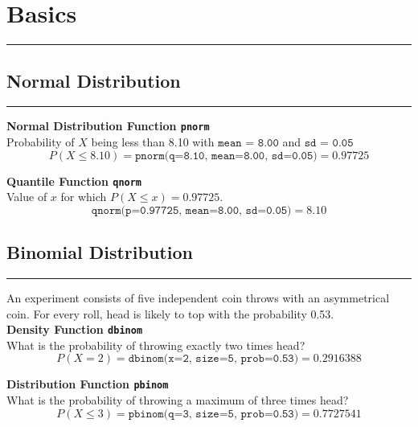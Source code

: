 
\section{Basics}
\noindent\rule[\linienAbstand]{\linewidth}{\linienDickeDick}

\subsection{Normal Distribution}
\noindent\rule[\linienAbstand]{\linewidth}{\linienDicke}
\textbf{Normal Distribution Function \texttt{pnorm}}\\
Probability of $X$ being less than 8.10 with $\texttt{mean = 8.00}$ and $\texttt{sd = 0.05}$
\begin{equation*}
  P(X \leq 8.10) = \texttt{pnorm(q=8.10, mean=8.00, sd=0.05)} = 0.97725
\end{equation*}

\textbf{Quantile Function \texttt{qnorm}}\\
Value of $x$ for which $P(X \leq x) = 0.97725$.
\begin{equation*}
  \texttt{qnorm(p=0.97725, mean=8.00, sd=0.05)} = 8.10
\end{equation*}

\subsection{Binomial Distribution}
\noindent\rule[\linienAbstand]{\linewidth}{\linienDicke}
An experiment consists of five independent coin throws with an asymmetrical coin. For every roll, head is likely to top with the probability 0.53.\\
\textbf{Density Function \texttt{dbinom}}\\
What is the probability of throwing exactly two times head?
\begin{equation*}
  P(X=2) = \texttt{dbinom(x=2, size=5, prob=0.53)} = 0.2916388
\end{equation*}

\textbf{Distribution Function \texttt{pbinom}}\\
What is the probability of throwing a maximum of three times head?
\begin{equation*}
  P(X \leq 3) = \texttt{pbinom(q=3, size=5, prob=0.53)} = 0.7727541
\end{equation*}

